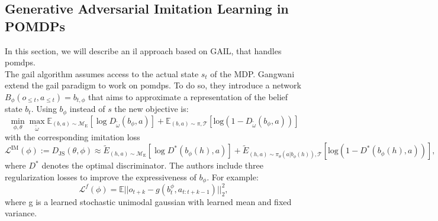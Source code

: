 \subsection{Generative Adversarial Imitation Learning in POMDPs}
\label{GAIL_POMDPS}
In this section, we will describe an \ac{il} approach based on GAIL, that handles \ac{pomdp}s.\\
The \ac{gail} algorithm assumes access to the actual state $s_t$ of the MDP. Gangwani \etAl \cite{gangwani2019learning} 
extend the \ac{gail} paradigm to work on \ac{pomdp}s. To do so, they introduce a network $B_{\phi}(o_{\leq t}, a_{\leq t}) = b_{t, \phi}$ that aims to approximate a 
representation of the belief state $b_t$. Using $b_{\phi}$ instead of $s$ the new objective is:
\begin{equation}
    \min_{\phi,\theta}\max_{\tilde{\omega}} \mathbb{E}_{(b,a)\sim\mathcal{M}_{\text{E}}}[\log D_{\tilde{\omega}}(b_{\phi},a)] + \mathbb{E}_{(b,a)\sim\pi,\mathcal{T}}[\mathrm{log}(1-D_{\tilde{\omega}}(b_{\phi},a))]
\end{equation}
with the corresponding imitation loss 
\begin{equation*}
    \mathcal{L}^{\text{IM}}(\phi) := D_{\text{JS}}(\theta,\phi) \approx \tilde{E}_{(h,a)\sim \mathcal{M}_\text{E}}[\log D^*(b_\phi(h),a)] + \tilde{E}_{(h,a)\sim \pi_\theta(a|b_\phi(h)),\mathcal{T}}[\mathrm{log}(1 - D^*(b_\phi(h),a))], 
\end{equation*}
where $D^*$ denotes the optimal discriminator. 
The authors include three regularization losses to improve the expressiveness of $b_{\phi}$. For example:
\begin{equation}
    \mathcal{L}^f(\phi) = \mathbb{E}|| o_{t+k} - g(b_t^\phi, a_{t:t+k-1})||_2^2,
\end{equation}
where g is a learned stochastic unimodal gaussian with learned mean and fixed variance.\\

